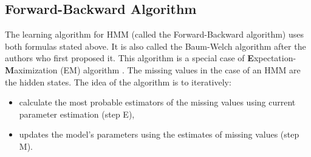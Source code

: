 \documentclass[shortabstract]{iithesis}
\begin{document}






\subsection{Forward-Backward Algorithm}

The learning algorithm for HMM (called the Forward-Backward algorithm) uses both formulas stated above. 
It is also called the Baum-Welch algorithm after the authors who first proposed it. This algorithm is a special case of \textbf{E}xpectation-\textbf{M}aximization (EM) algorithm \cite{baum_inequality_1967} \cite{baum_maximization_1970}. The missing values in the case of an HMM are the hidden states. The idea of the algorithm is to iteratively: 

\begin{itemize}
    \item calculate the most probable estimators of the missing values using current parameter estimation (step E),
    \item updates the model's parameters using the estimates of missing values (step M).
\end{itemize}
\end{document}
